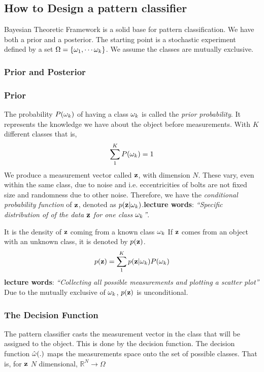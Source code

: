 \subsection{How to Design a pattern classifier}
Bayesian Theoretic Framework is a solid base for pattern classification. We have both a prior and a posterior.
The starting point is a stochastic experiment defined by a set $\Omega = \{\omega_1,\cdots\omega_k\}$. We assume the classes are mutually exclusive.
\subsubsection{Prior and Posterior}
\label{sub:Prior_and_Posterior}
\subsubsection{Prior}
\label{sub:Prior}
The probability $P(\omega_k)$ of having a class $\omega_k$ is called the \textit{prior probability}. It represents the knowledge we have about the object before measurements. With $K$ different classes that is,
\begin{equation}
    \sum_1^K P({\omega_k}) = 1
\end{equation}
\newline
We produce a measurement vector called $\mathbf{z}$, with dimension $N$. These vary, even within the same class, due to noise and i.e. eccentricities of bolts are not fixed size and randomness due to other noise. Therefore, we have the \textit{conditional probability function} of $\mathbf{z}$, denoted as $p(\mathbf{z}|\omega_k)$.\textbf{lecture words}: \textit{``Specific distribution of of the data $\mathbf{z}$ for one class $\omega_k$''}.\newline

It is the density of $\mathbf{z}$ coming from a known class $\omega_k$\newline
If $\mathbf{z}$ comes from an object with an unknown class, it is denoted by $p(\mathbf{z})$.
\begin{equation}
    p(\mathbf{z}) = \sum_1^K p(\mathbf{z}|\omega_k)P(\omega_k)
\end{equation}
\textbf{lecture words}: \textit{``Collecting all possible measurements and plotting a scatter plot''}
Due to the mutually exclusive of $\omega_k$, $p(\mathbf{z})$ is unconditional.


\subsubsection{The Decision Function}
\label{sub:The Decision Function}
The pattern classifier casts the measurement vector in the class that will be assigned to the object. This is done by the decision function.
The decision function $\hat\omega(.)$ maps the measurements space onto the set of possible classes.
That is, for $\mathbf{z}$ $N$ dimensional,
$\mathbb{R}^N \rightarrow \Omega$

